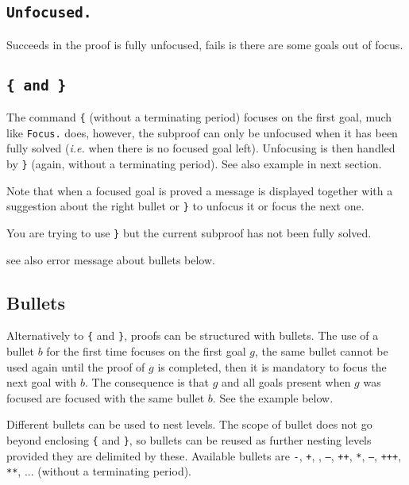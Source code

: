 \subsection[\tt Unfocused.]{\tt Unfocused.}
Succeeds in the proof is fully unfocused, fails is there are some
goals out of focus.

\subsection[\tt \{ \textrm{and} \}]{\tt \{ \textrm{and} \}\comindex{\{}\comindex{\}}}
The command {\tt \{} (without a terminating period) focuses on the
first goal, much like {\tt Focus.} does, however, the subproof can
only be unfocused when it has been fully solved (\emph{i.e.} when
there is no focused goal left). Unfocusing is then handled by {\tt \}}
(again, without a terminating period). See also example in next section.

Note that when a focused goal is proved a message is displayed
together with a suggestion about the right bullet or {\tt \}} to
unfocus it or focus the next one.

\begin{ErrMsgs}
\item {} You are trying to use {\tt \}} but the current subproof
  has not been fully solved.
\item see also error message about bullets below.
\end{ErrMsgs}

\subsection[Bullets]{Bullets
  }
Alternatively to {\tt \{} and {\tt \}}, proofs can be structured with
bullets. The use of a bullet $b$ for the first time focuses on the
first goal $g$, the same bullet cannot be used again until the proof
of $g$ is completed, then it is mandatory to focus the next goal with $b$. The
consequence is that $g$ and all goals present when $g$ was focused are
focused with the same bullet $b$. See the example below.

Different bullets can be used to nest levels. The scope of bullet does
not go beyond enclosing {\tt \{} and {\tt \}}, so bullets can be
reused as further nesting levels provided they are delimited by these.
Available bullets are {\tt -}, {\tt +}, {\tt *}, {\tt --}, {\tt ++}, {\tt **},
{\tt ---}, {\tt +++}, {\tt ***}, ... (without a
terminating period).

